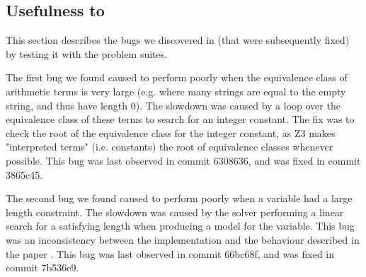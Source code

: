     \subsection{Usefulness to \us{}}

        This section describes the bugs we discovered in \us{} (that were subsequently fixed) by testing it with the \fuzzer{} problem suites.

        The first bug we found caused \us{} to perform poorly when the equivalence class of arithmetic terms is very large (e.g. where many strings are equal to the empty string, and thus have length 0). The slowdown was caused by a loop over the equivalence class of these terms to search for an integer constant. The fix was to check the root of the equivalence class for the integer constant, as Z3 makes "interpreted terms" (i.e. constants) the root of equivalence classes whenever possible. This bug was last observed in commit 6308636, and was fixed in commit 3865c45.

        The second bug we found caused \us{} to perform poorly when a variable had a large length constraint. The slowdown was caused by the solver performing a linear search for a satisfying length when producing a model for the variable. This bug was an inconsistency between the implementation and the behaviour described in the \us{} paper \cite{z3str3}. This bug was last observed in commit 66bc68f, and was fixed in commit 7b536e9.

